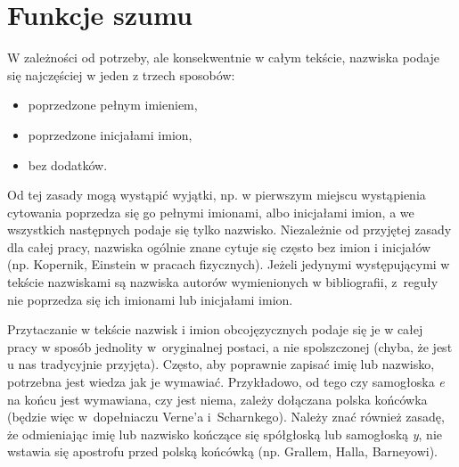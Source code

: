 \section{Funkcje szumu}

W zależności od potrzeby, ale konsekwentnie w całym tekście, nazwiska podaje się najczęściej w jeden z trzech sposobów:
\begin{itemize}
	\item poprzedzone pełnym imieniem,
	\item poprzedzone inicjałami imion,
	\item bez dodatków.
\end{itemize}
Od tej zasady mogą wystąpić wyjątki, np. w pierwszym miejscu wystąpienia cytowania poprzedza się go pełnymi imionami, albo inicjałami imion, a we wszystkich następnych podaje się tylko nazwisko. Niezależnie od przyjętej zasady dla całej pracy, nazwiska ogólnie znane cytuje się często bez imion i inicjałów (np. Kopernik, Einstein w pracach fizycznych). Jeżeli jedynymi występującymi w tekście nazwiskami są nazwiska autorów wymienionych w bibliografii, z~reguły nie poprzedza się ich imionami lub inicjałami imion.

Przytaczanie w tekście nazwisk i imion obcojęzycznych podaje się je w całej pracy w sposób jednolity \pauza w~oryginalnej postaci, a nie spolszczonej (chyba, że jest u nas tradycyjnie przyjęta). Często, aby poprawnie zapisać imię lub nazwisko, potrzebna jest wiedza jak je wymawiać. Przykładowo, od tego czy samogłoska \textit{e} na końcu jest wymawiana, czy jest niema, zależy dołączana polska końcówka (będzie więc w~dopełniaczu Verne'a i~Scharnkego). Należy znać również zasadę, że odmieniając imię lub nazwisko kończące się spółgłoską lub samogłoską \textit{y}, nie wstawia się apostrofu przed polską końcówką (np. Grallem, Halla, Barneyowi).